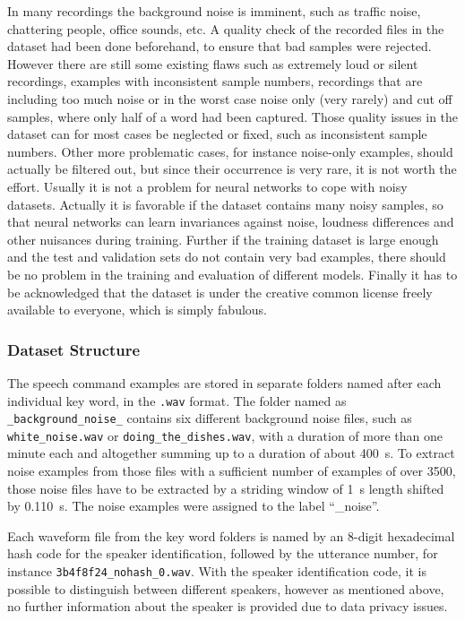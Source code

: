 In many recordings the background noise is imminent, such as traffic noise, chattering people, office sounds, etc.
A quality check of the recorded files in the dataset had been done beforehand, to ensure that bad samples were rejected.
However there are still some existing flaws such as extremely loud or silent recordings, examples with inconsistent sample numbers, recordings that are including too much noise or in the worst case noise only (very rarely) and cut off samples, where only half of a word had been captured.
Those quality issues in the dataset can for most cases be neglected or fixed, such as inconsistent sample numbers. 
Other more problematic cases, for instance noise-only examples, should actually be filtered out, but since their occurrence is very rare, it is not worth the effort.
Usually it is not a problem for neural networks to cope with noisy datasets. 
Actually it is favorable if the dataset contains many noisy samples, so that neural networks can learn invariances against noise, loudness differences and other nuisances during training.
Further if the training dataset is large enough and the test and validation sets do not contain very bad examples, there should be no problem in the training and evaluation of different models.
Finally it has to be acknowledged that the dataset is under the creative common license freely available to everyone, which is simply fabulous.



\subsubsection{Dataset Structure}\label{sec:exp_dataset_structure}
The speech command examples are stored in separate folders named after each individual key word, in the \texttt{.wav} format.
The folder named as \texttt{\_background\_noise\_} contains six different background noise files, such as \texttt{white\_noise.wav} or \texttt{doing\_the\_dishes.wav}, with a duration of more than one minute each and altogether summing up to a duration of about \SI{400}{s}.
To extract noise examples from those files with a sufficient number of examples of over 3500, those noise files have to be extracted by a striding window of \SI{1}{\second} length shifted by \SI{0.110}{\second}.
The noise examples were assigned to the label \enquote{\_noise}.

Each waveform file from the key word folders is named by an 8-digit hexadecimal hash code for the speaker identification, followed by the utterance number, for instance \texttt{3b4f8f24\_nohash\_0.wav}.
With the speaker identification code, it is possible to distinguish between different speakers, however as mentioned above, no further information about the speaker is provided due to data privacy issues.

